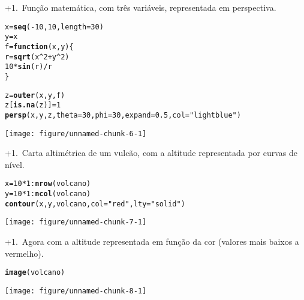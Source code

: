 \documentclass{article}\usepackage[]{graphicx}\usepackage[]{color}
\makeatletter
\def\maxwidth{ %
  \ifdim\Gin@nat@width>\linewidth
    \linewidth
  \else
    \Gin@nat@width
  \fi
}
\newcommand{\hlnum}[1]{\textcolor[rgb]{0.686,0.059,0.569}{#1}}%
\newcommand{\hlstr}[1]{\textcolor[rgb]{0.192,0.494,0.8}{#1}}%
\newcommand{\hlopt}[1]{\textcolor[rgb]{0,0,0}{#1}}%
\newcommand{\hlstd}[1]{\textcolor[rgb]{0.345,0.345,0.345}{#1}}%
\newcommand{\hlkwa}[1]{\textcolor[rgb]{0.161,0.373,0.58}{\textbf{#1}}}%
\newcommand{\hlkwb}[1]{\textcolor[rgb]{0.69,0.353,0.396}{#1}}%
\newcommand{\hlkwc}[1]{\textcolor[rgb]{0.333,0.667,0.333}{#1}}%
\newcommand{\hlkwd}[1]{\textcolor[rgb]{0.737,0.353,0.396}{\textbf{#1}}}%
\newenvironment{kframe}{%
 \def\at@end@of@kframe{}%
 \ifinner\ifhmode%
  \def\at@end@of@kframe{\end{minipage}}%
  \begin{minipage}{\columnwidth}%
 \fi\fi%
 \def\FrameCommand##1{\hskip\@totalleftmargin \hskip-\fboxsep
 \colorbox{shadecolor}{##1}\hskip-\fboxsep
     \hskip-\linewidth \hskip-\@totalleftmargin \hskip\columnwidth}%
 \MakeFramed {\advance\hsize-\width
   \@totalleftmargin\z@ \linewidth\hsize
   \@setminipage}}%
 {\par\unskip\endMakeFramed%
 \at@end@of@kframe}
\newenvironment{knitrout}{}{} %
\newcounter{graph}[section]
\renewcommand{\thegraph}{\number\numexpr\value{graph}+1\relax.~\stepcounter{graph}}
\makeatother
\begin{document}
\thegraph Função matemática, com três variáveis, representada em perspectiva.
\begin{knitrout}
\color{fgcolor}\begin{kframe}
\begin{alltt}
\hlstd{x} \hlkwb{=} \hlkwd{seq}\hlstd{(}\hlopt{-}\hlnum{10}\hlstd{,} \hlnum{10}\hlstd{,} \hlkwc{length} \hlstd{=} \hlnum{30}\hlstd{)}
\hlstd{y} \hlkwb{=} \hlstd{x}
\hlstd{f} \hlkwb{=} \hlkwa{function}\hlstd{(}\hlkwc{x}\hlstd{,} \hlkwc{y}\hlstd{) \{}
      \hlstd{r} \hlkwb{=} \hlkwd{sqrt}\hlstd{(x}\hlopt{^}\hlnum{2} \hlopt{+} \hlstd{y}\hlopt{^}\hlnum{2}\hlstd{)}
      \hlnum{10} \hlopt{*} \hlkwd{sin}\hlstd{(r)}\hlopt{/}\hlstd{r}
    \hlstd{\}}

\hlstd{z} \hlkwb{=} \hlkwd{outer}\hlstd{(x, y, f)}
\hlstd{z[}\hlkwd{is.na}\hlstd{(z)]} \hlkwb{=} \hlnum{1}
\hlkwd{persp}\hlstd{(x, y, z,} \hlkwc{theta} \hlstd{=} \hlnum{30}\hlstd{,} \hlkwc{phi} \hlstd{=} \hlnum{30}\hlstd{,} \hlkwc{expand} \hlstd{=} \hlnum{0.5}\hlstd{,} \hlkwc{col} \hlstd{=} \hlstr{"lightblue"}\hlstd{)}
\end{alltt}
\end{kframe}
\texttt{[image: figure/unnamed-chunk-6-1]} 

\end{knitrout}
\pagebreak
\thegraph Carta altimétrica de um vulcão, com a altitude representada por curvas de nível.
\begin{knitrout}
\color{fgcolor}\begin{kframe}
\begin{alltt}
\hlstd{x} \hlkwb{=} \hlnum{10} \hlopt{*} \hlnum{1}\hlopt{:}\hlkwd{nrow}\hlstd{(volcano)}
\hlstd{y} \hlkwb{=} \hlnum{10} \hlopt{*} \hlnum{1}\hlopt{:}\hlkwd{ncol}\hlstd{(volcano)}
\hlkwd{contour}\hlstd{(x, y, volcano,} \hlkwc{col} \hlstd{=} \hlstr{"red"}\hlstd{,} \hlkwc{lty} \hlstd{=} \hlstr{"solid"}\hlstd{)}
\end{alltt}
\end{kframe}
\texttt{[image: figure/unnamed-chunk-7-1]} 

\end{knitrout}
\pagebreak
\thegraph Agora com a altitude representada em função da cor (valores mais baixos a vermelho).
\begin{knitrout}
\color{fgcolor}\begin{kframe}
\begin{alltt}
\hlkwd{image}\hlstd{(volcano)}
\end{alltt}
\end{kframe}
\texttt{[image: figure/unnamed-chunk-8-1]} 

\end{knitrout}
\end{document}
